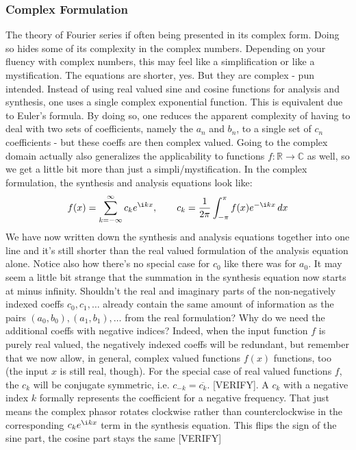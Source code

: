 \subsubsection{Complex Formulation}
The theory of Fourier series if often being presented in its complex form. Doing so hides some of its complexity in the complex numbers. Depending on your fluency with complex numbers, this may feel like a simplification or like a mystification. The equations are shorter, yes. But they are complex - pun intended. Instead of using real valued sine and cosine functions for analysis and synthesis, one uses a single complex exponential function. This is equivalent due to Euler's formula. By doing so, one reduces the apparent complexity of having to deal with two sets of coefficients, namely the $a_n$ and $b_n$, to a single set of $c_n$ coefficients - but these coeffs are then complex valued. Going to the complex domain actually also generalizes the applicability to functions $f: \mathbb{R} \rightarrow \mathbb{C}$ as well, so we get a little bit more than just a simpli/mystification. In the complex formulation, the synthesis and analysis equations look like:
\begin{equation}
\label{Eq:FourierSeriesComplex}
 f(x) = \sum_{k=-\infty}^\infty c_k  e^{\i k x}, \qquad
 c_k = \frac{1}{2\pi} \int_{-\pi}^{\pi} f(x) e^{-\i k x}  \, dx
\end{equation}
We have now written down the synthesis and analysis equations together into one line and it's still shorter than the real valued formulation of the analysis equation alone. Notice also how there's no special case for $c_0$ like there was for $a_0$. It may seem a little bit strange that the summation in the synthesis equation now starts at minus infinity. Shouldn't the real and imaginary parts of the non-negatively indexed coeffs $c_0, c_1, \ldots$ already contain the same amount of information as the pairs $(a_0,b_0),(a_1,b_1), \ldots$ from the real formulation? Why do we need the additional coeffs with negative indices? Indeed, when the input function  $f$ is purely real valued, the negatively indexed coeffs will be redundant, but remember that we now allow, in general, complex valued functions $f(x)$ functions, too (the input $x$ is still real, though). For the special case of real valued functions $f$, the $c_k$ will be conjugate symmetric, i.e. $c_{-k} = \overline{c_k}$. [VERIFY]. A $c_k$ with a negative index $k$ formally represents the coefficient for a negative frequency. That just means the complex phasor rotates clockwise rather than counterclockwise in the corresponding $c_k  e^{\i k x}$ term in the synthesis equation. This flips the sign of the sine part, the cosine part stays the same [VERIFY]

